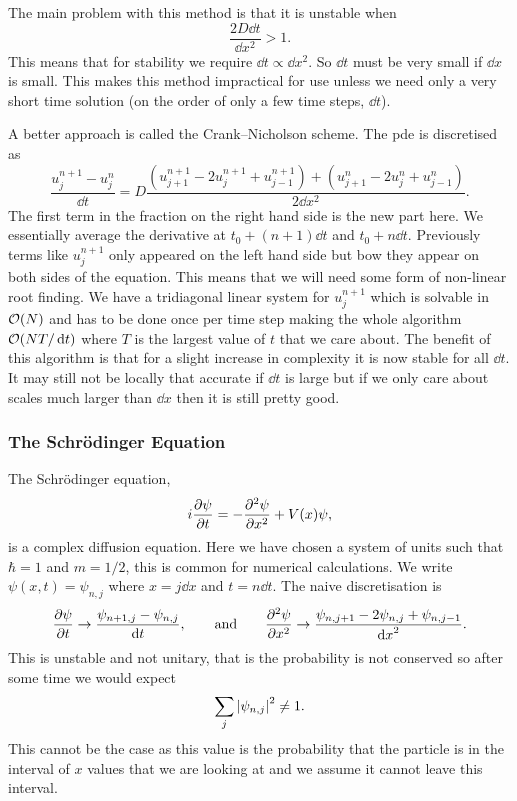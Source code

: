 \documentclass[a4paper]{article}
\begin{document}
    The main problem with this method is that it is unstable when
    \[\frac{2D\dd{t}}{\dd{x}^2} > 1.\]
    This means that for stability we require \(\dd{t} \propto \dd{x}^2\).
    So \(\dd{t}\) must be very small if \(\dd{x}\) is small.
    This makes this method impractical for use unless we need only a very short time solution (on the order of only a few time steps, \(\dd{t}\)).
    
    A better approach is called the Crank--Nicholson scheme.
    The \gls{pde} is discretised as
    \[\frac{u_j^{n+1} - u_j^n}{\dd{t}} = D\frac{(u_{j+1}^{n+1} - 2u_j^{n+1} + u_{j-1}^{n+1}) + (u_{j+1}^n - 2u_j^n + u_{j-1}^n)}{2\dd{x}^2}.\]
    The first term in the fraction on the right hand side is the new part here.
    We essentially average the derivative at \(t_0 + (n + 1)\dd{t}\) and \(t_0 + n\dd{t}\).
    Previously terms like \(u_j^{n+1}\) only appeared on the left hand side but bow they appear on both sides of the equation.
    This means that we will need some form of non-linear root finding.
    We have a tridiagonal linear system for \(u_j^{n+1}\) which is solvable in \(\order{N}\) and has to be done once per time step making the whole algorithm \(\order{NT/\dd{t}}\) where \(T\) is the largest value of \(t\) that we care about.
    The benefit of this algorithm is that for a slight increase in complexity it is now stable for all \(\dd{t}\).
    It may still not be locally that accurate if \(\dd{t}\) is large but if we only care about scales much larger than \(\dd{x}\) then it is still pretty good.
    
    \subsubsection{The Schr\"odinger Equation}
    The Schr\"odinger equation,
    \[i\pdv{\psi}{t} = -\pdv[2]{\psi}{x} + V(x)\psi,\]
    is a complex diffusion equation.
    Here we have chosen a system of units such that \(\hbar = 1\) and \(m = 1/2\), this is common for numerical calculations.
    We write \(\psi(x, t) = \psi_{n,j}\) where \(x = j\dd{x}\) and \(t = n\dd{t}\).
    The naive discretisation is
    \[\pdv{\psi}{t} \rightarrow \frac{\psi_{n+1,j} - \psi_{n,j}}{\dd{t}}, \qquad\text{and}\qquad \pdv[2]{\psi}{x} \rightarrow \frac{\psi_{n,j+1} - 2\psi_{n,j} + \psi_{n,j-1}}{\dd{x}^2}.\]
    This is unstable and not unitary, that is the probability is not conserved so after some time we would expect
    \[\sum_j \abs{\psi_{n,j}}^2 \ne 1.\]
    This cannot be the case as this value is the probability that the particle is in the interval of \(x\) values that we are looking at and we assume it cannot leave this interval.
    
\end{document}
